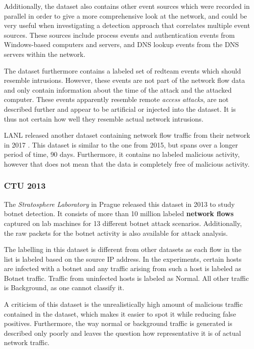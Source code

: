 Additionally, the dataset also contains other event sources which were recorded in parallel in order to give a more comprehensive look at the network, and could be very useful when investigating a detection approach that correlates multiple event sources. These sources include process events and authentication events from Windows-based computers and servers, and DNS lookup events from the DNS servers within the network. 

The dataset furthermore contains a labeled set of redteam events which should resemble intrusions. However, these events are not part of the network flow data and only contain information about the time of the attack and the attacked computer. These events apparently resemble remote \textit{access attacks}, are not described further and appear to be artificial or injected into the dataset. It is thus not certain how well they resemble actual network intrusions.


LANL released another dataset containing network flow traffic from their network in 2017 \cite{turcotte17}. This dataset is similar to the one from 2015, but spans over a longer period of time, 90 days. Furthermore, it contains no labeled malicious activity,  however that does not mean that the data is completely free of malicious activity.

\subsubsection*{CTU 2013 \cite{noauthor_ctu-13_nodate, garcia2014empirical}}

The \textit{Stratosphere Laboratory} in Prague released this dataset in 2013 to study botnet detection. It consists of more than 10 million labeled \textbf{network flows} captured on lab machines for 13 different botnet attack scenarios. Additionally, the raw packets for the botnet activity is also available for attack analysis. 

The labelling in this dataset is different from other datasets as each  flow  in  the  list  is  labeled  based  on  the  source  IP  address.  In  the experiments,  certain  hosts  are  infected  with  a  botnet  and  any  traffic  arising from such a host is labeled as Botnet traffic. Traffic from uninfected hosts is labeled as Normal. All other traffic is Background, as one cannot classify it. 

A criticism of this dataset is the unrealistically high amount of malicious traffic contained in the dataset, which makes it easier to spot it while reducing false positives. Furthermore, the way normal or background traffic is generated is described only poorly and leaves the question how representative it is of actual network traffic.

